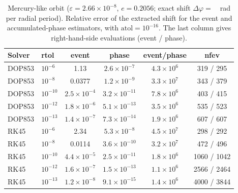 \begin{table}[!htbp]
\centering
\caption{Mercury-like orbit ($\varepsilon=2.66\times10^{-8}$, $e=0.2056$; exact shift $\Delta\varphi=$~\MercShift~rad per radial period). Relative error of the extracted shift for the event and accumulated-phase estimators, with $\mathrm{atol}=10^{-16}$. The last column gives right-hand-side evaluations (event / phase).}
\label{tab:mercury}
\begin{tabular}{llcccc}
\toprule
Solver & rtol & event & phase & event/phase & nfev \\
\midrule
DOP853 & $10^{-6}$ & 1.13 & $2.6\times10^{-7}$ & $4.3\times10^{6}$ & 319 / 295 \\
DOP853 & $10^{-8}$ & 0.0377 & $1.2\times10^{-9}$ & $3.3\times10^{7}$ & 343 / 379 \\
DOP853 & $10^{-10}$ & $2.5\times10^{-4}$ & $3.2\times10^{-11}$ & $7.8\times10^{6}$ & 403 / 415 \\
DOP853 & $10^{-12}$ & $1.8\times10^{-6}$ & $5.1\times10^{-13}$ & $3.5\times10^{6}$ & 535 / 523 \\
DOP853 & $10^{-13}$ & $1.4\times10^{-7}$ & $7.3\times10^{-14}$ & $1.9\times10^{6}$ & 607 / 607 \\
RK45 & $10^{-6}$ & 2.34 & $5.3\times10^{-8}$ & $4.5\times10^{7}$ & 298 / 292 \\
RK45 & $10^{-8}$ & 0.0114 & $3.6\times10^{-10}$ & $3.2\times10^{7}$ & 472 / 496 \\
RK45 & $10^{-10}$ & $4.4\times10^{-5}$ & $2.5\times10^{-11}$ & $1.8\times10^{6}$ & 1060 / 1042 \\
RK45 & $10^{-12}$ & $1.6\times10^{-7}$ & $1.5\times10^{-13}$ & $1.1\times10^{6}$ & 2566 / 2464 \\
RK45 & $10^{-13}$ & $1.2\times10^{-8}$ & $9.1\times10^{-15}$ & $1.4\times10^{6}$ & 4000 / 3844 \\
\bottomrule
\end{tabular}
\end{table}
